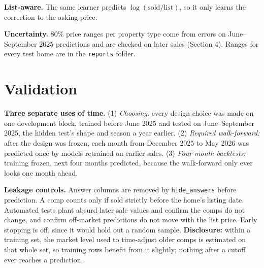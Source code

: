 \documentclass[11pt]{article}
\begin{document}
\textbf{List-aware.} The same learner predicts $\log(\mathrm{sold}/\mathrm{list})$, so it only learns the correction to the asking price.

\textbf{Uncertainty.} 80\% price ranges per property type come from errors on June--September 2025 predictions and are checked on later sales (Section 4). Ranges for every test home are in the \texttt{reports} folder.

\section{Validation}
\textbf{Three separate uses of time.} (1) \emph{Choosing:} every design choice was made on one development block, trained before June 2025 and tested on June--September 2025, the hidden test's shape and season a year earlier. (2) \emph{Required walk-forward:} after the design was frozen, each month from December 2025 to May 2026 was predicted once by models retrained on earlier sales. (3) \emph{Four-month backtests:} training frozen, next four months predicted, because the walk-forward only ever looks one month ahead.

\textbf{Leakage controls.} Answer columns are removed by \texttt{hide\_answers} before prediction. A comp counts only if sold strictly before the home's listing date. Automated tests plant absurd later sale values and confirm the comps do not change, and confirm off-market predictions do not move with the list price. Early stopping is off, since it would hold out a random sample. \textbf{Disclosure:} within a training set, the market level used to time-adjust older comps is estimated on that whole set, so training rows benefit from it slightly; nothing after a cutoff ever reaches a prediction.
\end{document}
